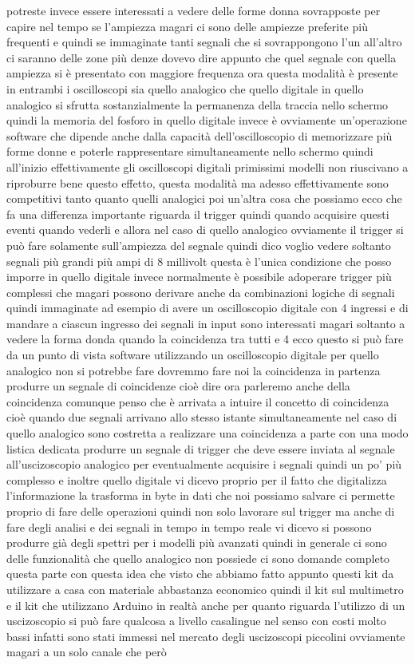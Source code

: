 potreste invece essere interessati a vedere delle forme donna sovrapposte per capire nel tempo se l'ampiezza magari ci sono delle ampiezze preferite più frequenti e quindi se immaginate tanti segnali che si sovrappongono l'un all'altro ci saranno delle zone più denze dovevo dire appunto che quel segnale con quella ampiezza si è presentato con maggiore frequenza ora questa modalità è presente in entrambi i oscilloscopi sia quello analogico che quello digitale in quello analogico si sfrutta sostanzialmente la permanenza della traccia nello schermo quindi la memoria del fosforo in quello digitale invece è ovviamente un'operazione software che dipende anche dalla capacità dell'oscilloscopio di memorizzare più forme donne e poterle rappresentare simultaneamente nello schermo quindi all'inizio effettivamente gli oscilloscopi digitali primissimi modelli non riuscivano a riproburre bene questo effetto, questa modalità ma adesso effettivamente sono competitivi tanto quanto quelli analogici poi un'altra cosa che possiamo ecco che fa una differenza importante riguarda il trigger quindi quando acquisire questi eventi quando vederli e allora nel caso di quello analogico ovviamente il trigger si può fare solamente sull'ampiezza del segnale quindi dico voglio vedere soltanto segnali più grandi più ampi di 8 millivolt questa è l'unica condizione che posso imporre in quello digitale invece normalmente è possibile adoperare trigger più complessi che magari possono derivare anche da combinazioni logiche di segnali quindi immaginate ad esempio di avere un oscilloscopio digitale con 4 ingressi e di mandare a ciascun ingresso dei segnali in input sono interessati magari soltanto a vedere la forma donda quando la coincidenza tra tutti e 4 ecco questo si può fare da un punto di vista software utilizzando un oscilloscopio digitale per quello analogico non si potrebbe fare dovremmo fare noi la coincidenza in partenza produrre un segnale di coincidenze cioè dire ora parleremo anche della coincidenza comunque penso che è arrivata a intuire il concetto di coincidenza cioè quando due segnali arrivano allo stesso istante simultaneamente nel caso di quello analogico sono costretta a realizzare una coincidenza a parte con una modo listica dedicata produrre un segnale di trigger che deve essere inviata al segnale all'uscizoscopio analogico per eventualmente acquisire i segnali quindi un po' più complesso e inoltre quello digitale vi dicevo proprio per il fatto che digitalizza l'informazione la trasforma in byte in dati che noi possiamo salvare ci permette proprio di fare delle operazioni quindi non solo lavorare sul trigger ma anche di fare degli analisi e dei segnali in tempo in tempo reale vi dicevo si possono produrre già degli spettri per i modelli più avanzati quindi in generale ci sono delle funzionalità che quello analogico non possiede ci sono domande completo questa parte con questa idea che visto che abbiamo fatto appunto questi kit da utilizzare a casa con materiale abbastanza economico quindi il kit sul multimetro e il kit che utilizzano Arduino in realtà anche per quanto riguarda l'utilizzo di un uscizoscopio si può fare qualcosa a livello casalingue nel senso con costi molto bassi infatti sono stati immessi nel mercato degli uscizoscopi piccolini ovviamente magari a un solo canale che però 